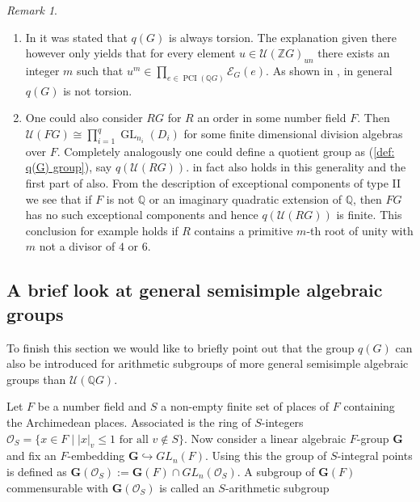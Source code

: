 \documentclass[a4paper,10pt]{amsart}
\theoremstyle{definition}
\theoremstyle{remark}
\newtheorem{remark}[lemma]{Remark}
\newcommand{\GL}{\operatorname{GL}}
\newcommand\PCI{\operatorname{PCI}}
\newcommand{\U}{{\mathcal U}}
\newcommand\mc{\mathcal}
\newcommand{\Z}{{\mathbb Z}}
\newcommand{\Q}{{\mathbb Q}}
\begin{document}
\begin{remark}
\begin{enumerate}
\item In \cite[Section 6]{JespersSun} it was stated that $q(G)$ is always torsion. The explanation given there however only yields that for every element $u \in \U(\Z G)_{un}$ there exists an integer $m$ such that $u^m \in \prod_{e \in \PCI(\Q G)}\mathcal{E}_G(e).$ As shown in , in general $q(G)$ is not torsion.
\item One could also consider $RG$ for $R$ an order in some number field $F$. Then $\mathcal{U}(FG) \cong \prod_{i=1}^q\GL_{n_i}(D_i)$ for some finite dimensional division algebras over $F$. Completely analogously one could define a quotient group as (\ref{def: q(G) group}), say $q(\U(RG))$.  in fact also holds in this generality and the first part of  also. From the description of exceptional components of type II we see that if $F$ is not $\Q$ or an imaginary quadratic extension of $\Q$, then 
$FG$ has no such exceptional components and hence $q(\U(RG))$ is finite. This conclusion for example holds if $R$ contains a primitive $m$-th root of unity with $m$ not a divisor of $4$ or $6$.
\end{enumerate}
\end{remark}


\subsection{A brief look at general semisimple algebraic groups}\label{the obstruction for general smeisimple}
To finish this section we would like to briefly point out that the group $q(G)$ can also be introduced for arithmetic subgroups of more general semisimple algebraic groups than $\mathcal{U}(\Q G)$.

Let $F$ be a number field and $S$ a non-empty finite set of places of $F$ containing the Archimedean places. Associated is the ring of $S$-integers $\mc{O}_S = \{ x\in F \mid |x|_v \leq 1 \text{ for all } v \notin S \}.$ Now consider a linear algebraic $F$-group $\mathbf{G}$ and fix an $F$-embedding $\mathbf{G} \hookrightarrow GL_n(F)$. Using this the group of $S$-integral points is defined as $\mathbf{G}(\mc{O}_S) := \mathbf{G}(F) \cap GL_n(\mc{O}_S)$. A subgroup of $\mathbf{G}(F)$ commensurable with $\mathbf{G}(\mc{O}_S)$ is called an $S$-arithmetic subgroup
\end{document}
